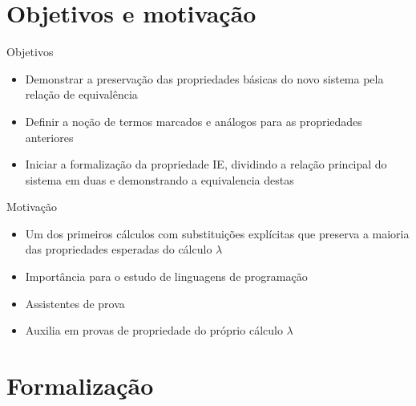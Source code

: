 \documentclass{beamer}
\begin{document}

\section{Objetivos e motivação}
\frame{\tableofcontents[currentsection]}

\begin{frame}{Objetivos}
\begin{itemize}
\item Demonstrar a preservação das propriedades básicas do novo sistema pela
    relação de equivalência
\item Definir a noção de termos marcados e análogos para as propriedades
    anteriores
\item Iniciar a formalização da propriedade IE, dividindo a relação principal do
    sistema em duas e demonstrando a equivalencia destas
\end{itemize}
\end{frame}

\begin{frame}{Motivação}
\begin{itemize}
\item Um dos primeiros cálculos com substituições explícitas que preserva a
    maioria das propriedades esperadas do cálculo $\lambda$
\item Importância para o estudo de linguagens de programação
\item Assistentes de prova
\item Auxilia em provas de propriedade do próprio cálculo $\lambda$
\end{itemize}
\end{frame}



\section{Formalização}
\end{document}
